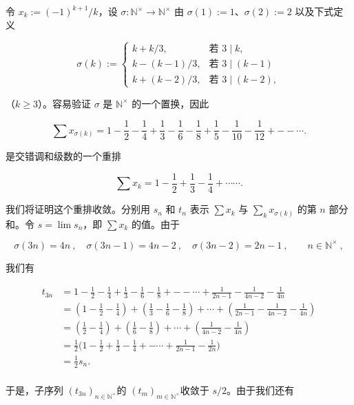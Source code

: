 \begin{example}

令 $ x_k := (-1)^{k+1}/k $，设 $ \sigma: \mathbb{N}^\times \to \mathbb{N}^\times $ 由 $ \sigma(1) := 1 $、$ \sigma(2) := 2 $ 以及下式定义

\begin{equation*}
\sigma(k):=\left\{\begin{array}{ll}k+k/3,&\text{若 }3\mid k,\\k-(k-1)/3,&\text{若 }3\mid(k-1)\\k+(k-2)/3,&\text{若 }3\mid(k-2),\end{array}\right.
\end{equation*}

（$ k \geq 3 $）。容易验证 $ \sigma $ 是 $ \mathbb{N}^\times $ 的一个置换，因此

\[
\sum x_{\sigma(k)}=1-\frac{1}{2}-\frac{1}{4}+\frac{1}{3}-\frac{1}{6}-\frac{1}{8}+\frac{1}{5}-\frac{1}{10}-\frac{1}{12}+--\cdots.
\]

是交错调和级数的一个重排

\[
\sum x_{k}=1-\frac{1}{2}+\frac{1}{3}-\frac{1}{4}+\cdots\cdots.
\]

我们将证明这个重排收敛。分别用 $ s_n $ 和 $ t_n $ 表示 $ \sum x_k $ 与 $ \sum_k x_{\sigma(k)} $ 的第 $ n $ 部分和。令 $ s = \lim s_n $，即 $ \sum x_k $ 的值。由于

\[
\sigma(3n)=4n~,\quad\sigma(3n-1)=4n-2~,\quad\sigma(3n-2)=2n-1~,\qquad n\in\mathbb{N}^\times~,
\]

我们有

\begin{equation*}
\begin{aligned}
t_{3n}&=1-\frac{1}{2}-\frac{1}{4}+\frac{1}{3}-\frac{1}{6}-\frac{1}{8}+--\cdots+\frac{1}{2n-1}-\frac{1}{4n-2}-\frac{1}{4n}\\&=\left(1-\frac{1}{2}-\frac{1}{4}\right)+\left(\frac{1}{3}-\frac{1}{6}-\frac{1}{8}\right)+\cdots+\left(\frac{1}{2n-1}-\frac{1}{4n-2}-\frac{1}{4n}\right)\\&=\left(\frac{1}{2}-\frac{1}{4}\right)+\left(\frac{1}{6}-\frac{1}{8}\right)+\cdots+\left(\frac{1}{4n-2}-\frac{1}{4n}\right)\\&=\frac{1}{2}\Big(1-\frac{1}{2}+\frac{1}{3}-\frac{1}{4}+-\cdots+\frac{1}{2n-1}-\frac{1}{2n}\Big)\\&=\frac{1}{2}s_{n}.\\
\end{aligned}
\end{equation*}

于是，子序列 $ (t_{3n})_{n \in \mathbb{N}^\times} \text{的 } (t_m)_{m \in \mathbb{N}^\times} \text{收敛于 } s/2 $。由于我们还有


\end{example}
